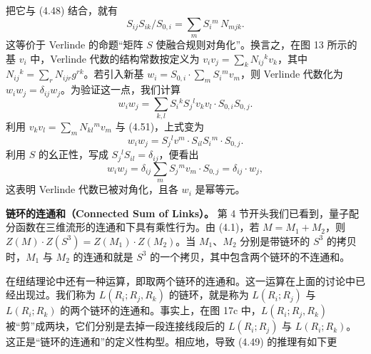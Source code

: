 \documentclass[11pt,a4paper]{article}
\begin{document}
把它与 (4.48) 结合，就有
\begin{equation}
    S_{ij}S_{ik}/S_{0,i} = \sum_m S_i{}^m\, N_{mjk}. \tag{4.51}
\end{equation}
这等价于 Verlinde 的命题“矩阵 $S$ 使融合规则对角化”。换言之，在图 13 所示的基 $v_i$ 中，Verlinde 代数的结构常数按定义为 $v_iv_j=\sum_k N_{ij}{}^k v_k$，其中 $N_{ij}{}^k=\sum_r N_{ijr}g^{rk}$。若引入新基 $w_i=S_{0,i}\cdot\sum_m S_i{}^m v_m$，则 Verlinde 代数化为 $w_iw_j=\delta_{ij}w_j$。为验证这一点，我们计算
\begin{equation}
    w_iw_j = \sum_{k,l} S_i{}^k S_j{}^l v_kv_l\cdot S_{0,i}S_{0,j}. \tag{4.52}
\end{equation}
利用 $v_kv_l=\sum_m N_{kl}{}^m v_m$ 与 (4.51)，上式变为
\begin{equation}
    w_iw_j = S_j{}^l v^m\cdot S_{il}S_i{}^m\cdot S_{0,j}. \tag{4.53}
\end{equation}
利用 $S$ 的幺正性，写成 $S_j{}^l S_{il}=\delta_{ij}$，便看出
\begin{equation}
    w_iw_j = \delta_{ij}\sum_m S_j{}^m v_m\cdot S_{0,j} = \delta_{ij}\cdot w_j, \tag{4.54}
\end{equation}
这表明 Verlinde 代数已被对角化，且各 $w_i$ 是幂等元。

\textbf{链环的连通和（Connected Sum of Links）。} 第 4 节开头我们已看到，量子配分函数在三维流形的连通和下具有乘性行为。由 (4.1)，若 $M=M_1+M_2$，则 $Z(M)\cdot Z(S^3)=Z(M_1)\cdot Z(M_2)$。当 $M_1$、$M_2$ 分别是带链环的 $S^3$ 的拷贝时，$M_1$ 与 $M_2$ 的连通和就是 $S^3$ 的一个拷贝，其中包含两个链环的不连通和。

在纽结理论中还有一种运算，即取两个链环的连通和。这一运算在上面的讨论中已经出现过。我们称为 $L(R_i;R_j,R_k)$ 的链环，就是称为 $L(R_i;R_j)$ 与 $L(R_i;R_k)$ 的两个链环的连通和。事实上，在图 17c 中，$L(R_i;R_j,R_k)$ 被“剪”成两块，它们分别是去掉一段连接线段后的 $L(R_i;R_j)$ 与 $L(R_i;R_k)$。这正是“链环的连通和”的定义性构型。相应地，导致 (4.49) 的推理有如下更
\end{document}
